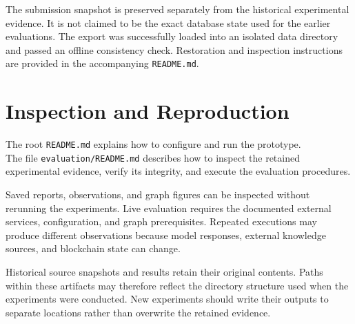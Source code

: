 The submission snapshot is preserved separately from the historical
experimental evidence. It is not claimed to be the exact database
state used for the earlier evaluations. The export was successfully
loaded into an isolated data directory and passed an offline
consistency check. Restoration and inspection instructions are
provided in the accompanying \texttt{README.md}.

\section{Inspection and Reproduction}

The root \texttt{README.md} explains how to configure and run the
prototype. 
\\The file \texttt{evaluation/README.md} describes how to
inspect the retained experimental evidence, verify its integrity,
and execute the evaluation procedures.

Saved reports, observations, and graph figures can be inspected
without rerunning the experiments. Live evaluation requires the
documented external services, configuration, and graph prerequisites.
Repeated executions may produce different observations because
model responses, external knowledge sources, and blockchain state
can change.

Historical source snapshots and results retain their original
contents. Paths within these artifacts may therefore reflect the
directory structure used when the experiments were conducted.
New experiments should write their outputs to separate locations
rather than overwrite the retained evidence.
